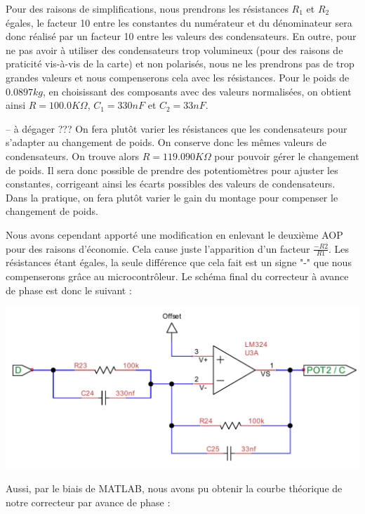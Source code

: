\documentclass[11pt, french]{article} %
\begin{document}
Pour des raisons de simplifications, nous prendrons les résistances $R_1$ et $R_2$ égales, le facteur 10 entre les constantes du numérateur et du dénominateur sera donc réalisé par un facteur 10 entre les valeurs des condensateurs. En outre, pour ne pas avoir à utiliser des condensateurs trop volumineux (pour des raisons de praticité vis-à-vis de la carte) et non polarisés, nous ne les prendrons pas de trop grandes valeurs et nous compenserons cela avec les résistances. Pour le poids de $0.0897 kg$, en choisissant des composants avec des valeurs normalisées, on obtient ainsi $R=100.0 K\Omega$, $C_1=330 nF$ et $C_2=33 nF$.

\vspace{0.5cm}
-- à dégager ???
On fera plutôt varier les résistances que les condensateurs pour s'adapter au changement de poids. On conserve donc les mêmes valeurs de condensateurs. On trouve alors $R=119.090 K\Omega$ pour pouvoir gérer le changement de poids. Il sera donc possible de prendre des potentiomètres pour ajuster les constantes, corrigeant ainsi les écarts possibles des valeurs de condensateurs. Dans la pratique, on fera plutôt varier le gain du montage pour compenser le changement de poids. 

\vspace{0.5cm}

Nous avons cependant apporté une modification en enlevant le deuxième AOP pour des raisons d'économie. Cela cause juste l'apparition d'un facteur $\frac{-R2}{R1}$. Les résistances étant égales, la seule différence que cela fait est un signe "-" que nous compenserons grâce au microcontrôleur. Le schéma final du correcteur à avance de phase est donc le suivant :

\begin{center}
\includegraphics[scale = 0.8]{SolutionAnalogique/AvPhase.pdf}
\end{center}

Aussi, par le biais de MATLAB, nous avons pu obtenir la courbe théorique de notre correcteur par avance de phase :
\end{document}
